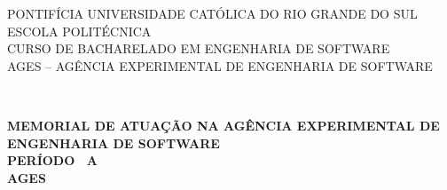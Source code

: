 \begin{capa}
  \centering
  \uppercase{
    PONTIFÍCIA UNIVERSIDADE CATÓLICA DO RIO GRANDE DO SUL\\
    ESCOLA POLITÉCNICA\\
    CURSO DE BACHARELADO EM ENGENHARIA DE SOFTWARE\\
    AGES -- AGÊNCIA EXPERIMENTAL DE ENGENHARIA DE SOFTWARE\\
  }

  \vfill
  \autor\\
  \vfill

  \textbf{
    \uppercase{
      Memorial de atuação na Agência Experimental de Engenharia de Software\\
      Período \inicio\ a \fim\\
      AGES \ages
    }
  }

  \vfill
  \local\\
  \ano
\end{capa}

